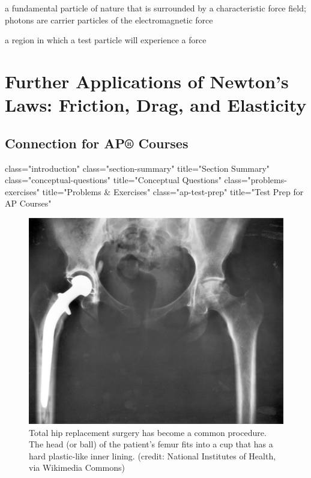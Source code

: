 \documentclass[
]{book}
\providecommand{\tightlist}{%
  \setlength{\itemsep}{0pt}\setlength{\parskip}{0pt}}
\begin{document}
\begin{description}
\tightlist
\item[carrier particle]
a fundamental particle of nature that is surrounded by a
characteristic force field; photons are carrier particles of the
electromagnetic force
\end{description}

\begin{description}
\tightlist
\item[force field]
a region in which a test particle will experience a force
\end{description}

\hypertarget{further-applications-of-newtons-laws-friction-drag-and-elasticity}{%
\chapter{Further Applications of Newton's Laws: Friction, Drag, and Elasticity}\label{further-applications-of-newtons-laws-friction-drag-and-elasticity}}

\hypertarget{connection-for-ap-courses-2}{%
\section{Connection for AP® Courses}\label{connection-for-ap-courses-2}}

class="introduction"
class="section-summary"
title="Section Summary"
class="conceptual-questions"
title="Conceptual Questions"
class="problems-exercises"
title="Problems \& Exercises"
class="ap-test-prep" title="Test
Prep for AP Courses"

\begin{figure}
\hypertarget{import-auto-id1165298796781}{%
\centering
\includegraphics{images/Figure_06_00_01.jpg}
\caption{Total hip replacement surgery has become a common procedure. The head
(or ball) of the patient's femur fits into a cup that has a hard
plastic-like inner lining. (credit: National Institutes of Health, via
Wikimedia
Commons)}\label{import-auto-id1165298796781}
}
\end{figure}
\end{document}
